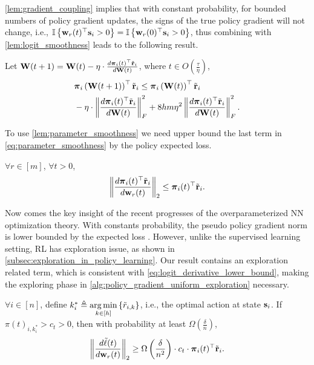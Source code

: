 \cref{lem:gradient_coupling} implies that with constant probability, for bounded numbers of policy gradient updates, the signs of the true policy gradient will not change, i.e., ${\mathbb{I}}\left\{ {\mathbf{w}}_r(t)^\top {\mathbf{s}}_i > 0 \right\} = {\mathbb{I}}\left\{ {\mathbf{w}}_r(0)^\top {\mathbf{s}}_i > 0 \right\}$, thus combining with \cref{lem:logit_smoothness} leads to the following result.
\begin{lem}
\label{lem:parameter_smoothness}
    Let ${\mathbf{W}}(t+1) = {\mathbf{W}}(t) - \eta \cdot \frac{d {\boldsymbol{\pi}}_i(t)^\top {\tilde{\mathbf{r}}}_i}{d {\mathbf{W}}(t)}$, where $t \in O\left( \frac{\tau}{\eta}\right)$,
\begin{equation}
\label{eq:parameter_smoothness}
\begin{split}
\small
    &\rvpi_i\left( \rmW(t+1) \right)^\top \rvtilder_i \le \rvpi_i\left( \rmW(t) \right)^\top \rvtilder_i \\
    &- \eta \cdot \left\| \frac{d \rvpi_i(t)^\top \rvtilder_i}{d \rmW(t)} \right\|_F^2 + 8 h m \eta^2 \left\| \frac{d \rvpi_i(t)^\top \rvtilder_i}{d \rmW(t)} \right\|_F^2.
\end{split}
\end{equation}
\end{lem}

To use \cref{lem:parameter_smoothness} we need upper bound the last term in \cref{eq:parameter_smoothness} by the policy expected loss.
\begin{lem}
\label{lem:gradient_upper_bound}
$\forall r \in [m]$, $\forall t > 0$,
\begin{equation*}
\begin{split}
	\left\| \frac{d {\boldsymbol{\pi}}_i(t)^\top {\tilde{\mathbf{r}}}_i}{d {\mathbf{w}}_r(t)} \right\|_2 \le {\boldsymbol{\pi}}_{i}(t)^\top {\tilde{\mathbf{r}}}_i.
\end{split}
\end{equation*}
\end{lem}

Now comes the key insight of the recent progresses of the overparameterized NN optimization theory. With constants probability, the pseudo policy gradient norm is lower bounded by the expected loss \citep{li2018learning}. However, unlike the supervised learning setting, RL has exploration issue, as shown in \cref{subsec:exploration_in_policy_learning}. Our result contains an exploration related term, which is consistent with \cref{eq:logit_derivative_lower_bound}, making the exploring phase in \cref{alg:policy_gradient_uniform_exploration} necessary.

\begin{lem}
\label{lem:gradient_lower_bound}
	$\forall i \in [n]$, define $k_i^* \triangleq \operatorname*{arg\,min}\limits_{k \in [h]}\left\{ \tilde{r}_{i,k} \right\}$, i.e., the optimal action at state ${\mathbf{s}}_{i}$. If $\pi(t)_{i, k_i^*} > c_t > 0$, then with probability at least $\Omega\left( \frac{\delta}{n} \right)$,
\begin{equation*}
\begin{split}
	\left\| \frac{d\tilde{\ell}(t)}{d {\mathbf{w}}_r(t)} \right\|_2 \ge \Omega\left( \frac{\delta}{n^2} \right) \cdot c_t \cdot  {\boldsymbol{\pi}}_{i}(t)^\top {\tilde{\mathbf{r}}}_{i}.
\end{split}
\end{equation*}
\end{lem}

